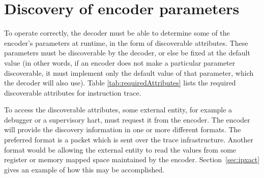 \section {Discovery of encoder parameters} \label{sec:disco}

To operate correctly, the decoder must be able to determine some of the encoder's parameters 
at runtime, in the form of discoverable attributes.  These parameters must be discoverable by the 
decoder, or else be fixed at the default value (in other words, if an encoder does not make a 
particular parameter discoverable, it must implement only the default value of that parameter, 
which the decoder will also use).  Table \ref{tab:requiredAttributes} lists the required 
discoverable attributes for instruction trace.

To access the discoverable attributes, some external entity, for example a debugger or a 
supervisory hart, must request it from the encoder. The encoder will
provide the discovery information in one or more different formats.  
The preferred format is a packet which is sent over the trace infrastructure.
Another format would be allowing the external entity to read the
values from some register or memory mapped space maintained by the encoder.
Section~\ref{sec:ipxact} gives an example of how this may be accomplished.

